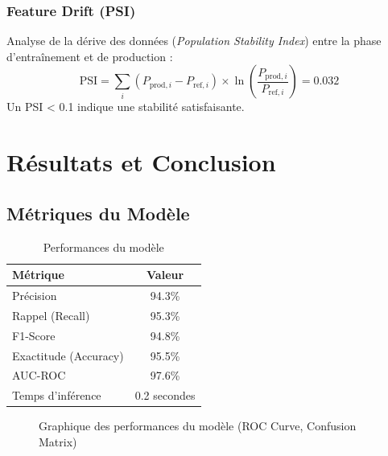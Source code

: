 \documentclass[12pt,a4paper]{article}
\begin{document}
\subsubsection{Feature Drift (PSI)}
Analyse de la dérive des données (\textit{Population Stability Index}) entre la phase d'entraînement et de production :
\begin{equation}
\text{PSI} = \sum_{i} (P_{\text{prod},i} - P_{\text{ref},i}) \times \ln\left(\frac{P_{\text{prod},i}}{P_{\text{ref},i}}\right) = 0.032
\end{equation}
Un PSI < 0.1 indique une stabilité satisfaisante.

\section{Résultats et Conclusion}
\label{sec:conclusion}

\subsection{Métriques du Modèle}
\begin{table}[H]
\centering
\caption{Performances du modèle}
\label{tab:performance}
\begin{tabular}{l c}
\toprule
\textbf{Métrique} & \textbf{Valeur} \\
\midrule
Précision & 94.3\% \\
Rappel (Recall) & 95.3\% \\
F1-Score & 94.8\% \\
Exactitude (Accuracy) & 95.5\% \\
AUC-ROC & 97.6\% \\
Temps d'inférence & 0.2 secondes \\
\bottomrule
\end{tabular}
\end{table}

\begin{figure}[H]
\centering
{}
\caption{Graphique des performances du modèle (ROC Curve, Confusion Matrix)}
\label{fig:model_performance}
\end{figure}
\end{document}
